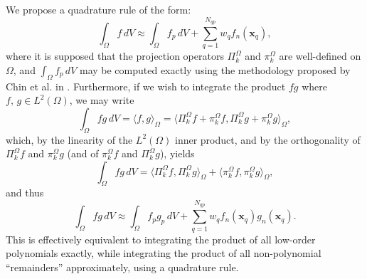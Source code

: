	We propose a quadrature rule of the form:
	\begin{equation}
		\int_\Omega f \, dV \approx \int_\Omega f_p \, dV + \sum_{q=1}^{N_{qp}} w_q f_n(\mathbf{x}_q),
	\end{equation}
	where it is supposed that the projection operators $\Pi^{\Omega}_k$ and $\pi^{\Omega}_k$ are well-defined on $\Omega$, and $\int_\Omega f_p \, dV$ may be computed exactly using the methodology proposed by Chin et al. in \cite{Chin:15}. Furthermore, if we wish to integrate the product $f g$ where $f, \, g \in L^2 (\Omega)$, we may write
	\begin{equation}
		\int_\Omega f g \, dV = \langle f, g \rangle_{\Omega} = \langle \Pi^{\Omega}_k f + \pi^{\Omega}_k f, \Pi^{\Omega}_k g + \pi^{\Omega}_k  g \rangle_{\Omega},
	\end{equation}
	which, by the linearity of the $L^2 (\Omega)$ inner product, and by the orthogonality of $\Pi^{\Omega}_k f$ and $\pi^{\Omega}_k g$ (and of $\pi^{\Omega}_k f$ and $\Pi^{\Omega}_k g$), yields
	\begin{equation}
		\int_\Omega f g \, dV = \langle \Pi^{\Omega}_k f, \Pi^{\Omega}_k g \rangle_{\Omega} + \langle \pi^{\Omega}_k f, \pi^{\Omega}_k g \rangle_{\Omega},
	\end{equation}
	and thus
	\begin{equation}
		\int_\Omega f g \, dV \approx \int_\Omega f_p g_p \, dV + \sum_{q=1}^{N_{qp}} w_q f_n(\mathbf{x}_q) g_n(\mathbf{x}_q).
	\end{equation}
	This is effectively equivalent to integrating the product of all low-order polynomials exactly, while integrating the product of all non-polynomial ``remainders'' approximately, using a quadrature rule.
	
